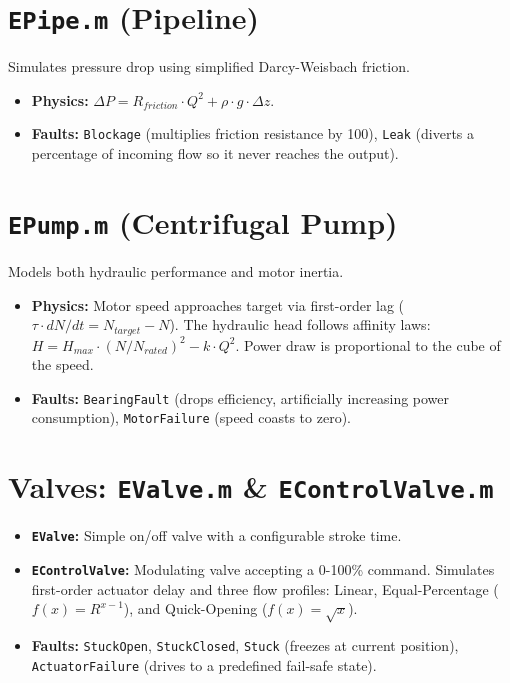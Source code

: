 \documentclass[11pt,a4paper]{report}
\begin{document}
\section{\texttt{EPipe.m} (Pipeline)}
Simulates pressure drop using simplified Darcy-Weisbach friction.
\begin{itemize}
    \item \textbf{Physics:} $\Delta P = R_{friction} \cdot Q^2 + \rho \cdot g \cdot \Delta z$.
    \item \textbf{Faults:} \texttt{Blockage} (multiplies friction resistance by 100), \texttt{Leak} (diverts a percentage of incoming flow so it never reaches the output).
\end{itemize}

\section{\texttt{EPump.m} (Centrifugal Pump)}
Models both hydraulic performance and motor inertia.
\begin{itemize}
    \item \textbf{Physics:} Motor speed approaches target via first-order lag ($\tau \cdot dN/dt = N_{target} - N$). The hydraulic head follows affinity laws: $H = H_{max} \cdot (N/N_{rated})^2 - k \cdot Q^2$. Power draw is proportional to the cube of the speed.
    \item \textbf{Faults:} \texttt{BearingFault} (drops efficiency, artificially increasing power consumption), \texttt{MotorFailure} (speed coasts to zero).
\end{itemize}

\section{Valves: \texttt{EValve.m} \& \texttt{EControlValve.m}}
\begin{itemize}
    \item \textbf{\texttt{EValve}:} Simple on/off valve with a configurable stroke time.
    \item \textbf{\texttt{EControlValve}:} Modulating valve accepting a 0-100\% command. Simulates first-order actuator delay and three flow profiles: Linear, Equal-Percentage ($f(x) = R^{x-1}$), and Quick-Opening ($f(x) = \sqrt{x}$).
    \item \textbf{Faults:} \texttt{StuckOpen}, \texttt{StuckClosed}, \texttt{Stuck} (freezes at current position), \texttt{ActuatorFailure} (drives to a predefined fail-safe state).
\end{itemize}
\end{document}
